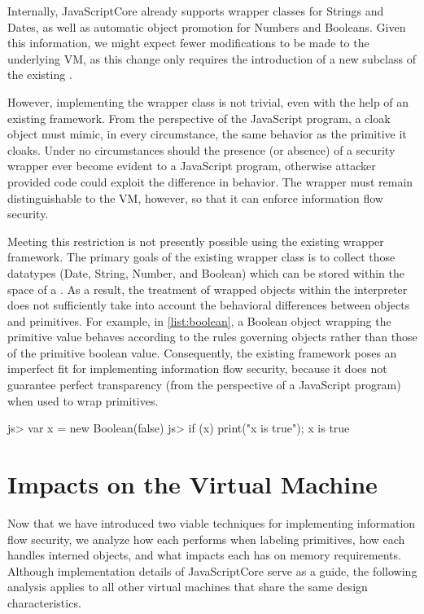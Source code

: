 Internally, JavaScriptCore already supports wrapper classes for Strings and Dates, as well as automatic object promotion for Numbers and Booleans.
Given this information, we might expect fewer modifications to be made to the underlying VM, as this change only requires the introduction of a new subclass of the existing .

However, implementing the wrapper class is not trivial, even with the help of an existing framework.
From the perspective of the JavaScript program, a cloak object must mimic, in every circumstance, the same behavior as the primitive it cloaks.
Under no circumstances should the presence (or absence) of a security wrapper ever become evident to a JavaScript program, otherwise attacker provided code could exploit the difference in behavior.
The wrapper must remain distinguishable to the VM, however, so that it can enforce information flow security.

Meeting this restriction is not presently possible using the existing wrapper framework.
The primary goals of the existing wrapper class is to collect those datatypes (Date, String, Number, and Boolean) which can be stored within the space of a .
As a result, the treatment of wrapped objects within the interpreter does not sufficiently take into account the behavioral differences between objects and primitives.
For example, in \autoref{list:boolean}, a Boolean object wrapping the primitive value  behaves according to the rules governing objects rather than those of the primitive boolean value.
Consequently, the existing framework poses an imperfect fit for implementing information flow security, because it does not guarantee perfect transparency (from the perspective of a JavaScript program) when used to wrap primitives.

\begin{jscode}
js> var x = new Boolean(false)
js> if (x) { print("x is true"); }
    x is true
\end{jscode}

\section{Impacts on the Virtual Machine}
\label{sec:analysis}

Now that we have introduced two viable techniques for implementing information flow security, we analyze how each performs when labeling primitives, how each handles interned objects, and what impacts each has on memory requirements.
Although implementation details of JavaScriptCore serve as a guide, the following analysis applies to all other virtual machines that share the same design characteristics.

